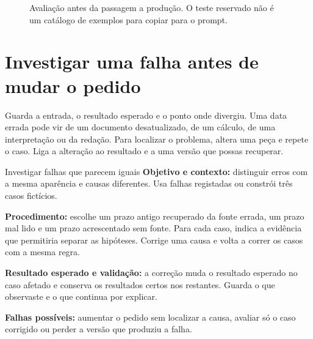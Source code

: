 \begin{figure}[htbp]
\centering
{}
\caption{Avaliação antes da passagem a produção. O teste reservado não é um catálogo de exemplos para copiar para o prompt.}
\label{fig:avaliacao}
\end{figure}

\section{Investigar uma falha antes de mudar o pedido}

Guarda a entrada, o resultado esperado e o ponto onde divergiu. Uma data errada pode vir de um documento desatualizado, de um cálculo, de uma interpretação ou da redação. Para localizar o problema, altera uma peça e repete o caso. Liga a alteração ao resultado e a uma versão que possas recuperar.

\begin{promptlabbox}{Investigar falhas que parecem iguais}
\textbf{Objetivo e contexto:} distinguir erros com a mesma aparência e causas diferentes. Usa falhas registadas ou constrói três casos fictícios.

\textbf{Procedimento:} escolhe um prazo antigo recuperado da fonte errada, um prazo mal lido e um prazo acrescentado sem fonte. Para cada caso, indica a evidência que permitiria separar as hipóteses. Corrige uma causa e volta a correr os casos com a mesma regra.

\textbf{Resultado esperado e validação:} a correção muda o resultado esperado no caso afetado e conserva os resultados certos nos restantes. Guarda o que observaste e o que continua por explicar.

\textbf{Falhas possíveis:} aumentar o pedido sem localizar a causa, avaliar só o caso corrigido ou perder a versão que produziu a falha.
\end{promptlabbox}

